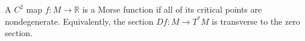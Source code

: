 A $C^2$ map $f: M \to \mathbb{R}$ is a Morse function if all of its critical points are nondegenerate. Equivalently, the section $Df: M \to T^*M$ is transverse to the zero section.
